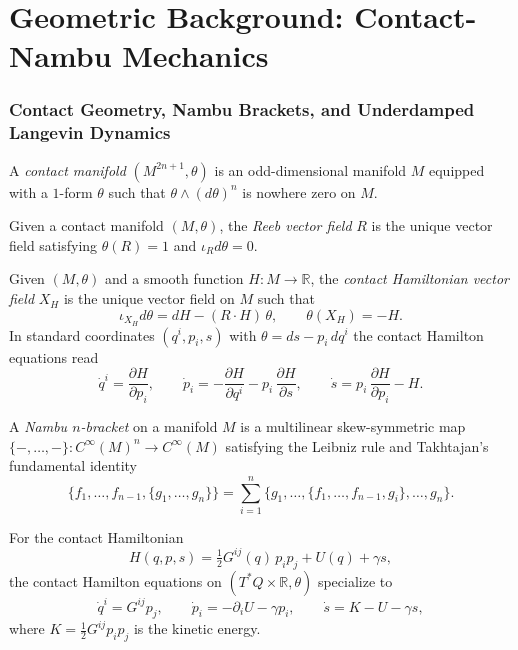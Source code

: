 \part{Geometric Background: Contact-Nambu Mechanics}

\section{Contact Geometry, Nambu Brackets, and Underdamped Langevin Dynamics}

\begin{definition}\label{def-contact-manifold}
A \emph{contact manifold} $(M^{2n+1}, \theta)$ is an odd-dimensional manifold $M$ equipped with a $1$-form $\theta$ such that $\theta \wedge (d\theta)^n$ is nowhere zero on $M$.
\end{definition}

\begin{definition}\label{def-reeb}
Given a contact manifold $(M, \theta)$, the \emph{Reeb vector field} $R$ is the unique vector field satisfying $\theta(R) = 1$ and $\iota_R d\theta = 0$.
\end{definition}

\begin{definition}\label{def-contact-hamiltonian}
Given $(M, \theta)$ and a smooth function $H : M \to \mathbb R$, the \emph{contact Hamiltonian vector field} $X_H$ is the unique vector field on $M$ such that
\[
\iota_{X_H} d\theta = dH - (R \cdot H)\, \theta,
\qquad
\theta(X_H) = -H.
\]
In standard coordinates $(q^i, p_i, s)$ with $\theta = ds - p_i\, dq^i$ the contact Hamilton equations read
\[
\dot q^i = \frac{\partial H}{\partial p_i},
\qquad
\dot p_i = -\frac{\partial H}{\partial q^i} - p_i\, \frac{\partial H}{\partial s},
\qquad
\dot s = p_i\, \frac{\partial H}{\partial p_i} - H.
\]
\end{definition}

\begin{definition}\label{def-nambu-bracket}
A \emph{Nambu $n$-bracket} on a manifold $M$ is a multilinear skew-symmetric map $\{-,\dots,-\} : C^\infty(M)^n \to C^\infty(M)$ satisfying the Leibniz rule and Takhtajan's fundamental identity
\[
\{f_1,\dots,f_{n-1},\{g_1,\dots,g_n\}\}
= \sum_{i=1}^n \{g_1,\dots,\{f_1,\dots,f_{n-1},g_i\},\dots,g_n\}.
\]
\end{definition}

\begin{theorem}\label{thm-contact-nambu-eom}
For the contact Hamiltonian
\[
H(q,p,s) = \tfrac{1}{2} G^{ij}(q)\, p_i p_j + U(q) + \gamma s,
\]
the contact Hamilton equations on $(T^*Q \times \mathbb R, \theta)$ specialize to
\[
\dot q^i = G^{ij} p_j,
\qquad
\dot p_i = -\partial_i U - \gamma p_i,
\qquad
\dot s = K - U - \gamma s,
\]
where $K = \tfrac{1}{2} G^{ij} p_i p_j$ is the kinetic energy.
\end{theorem}

